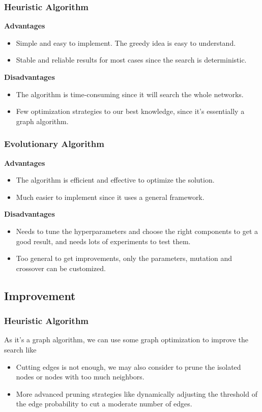 \documentclass{article}
\begin{document}
\subsubsection{Heuristic Algorithm}
\textbf{Advantages}
\begin{itemize}
    \item Simple and easy to implement. The greedy idea is easy to understand.
    \item Stable and reliable results for most cases since the search is deterministic.
\end{itemize}
\textbf{Disadvantages}
\begin{itemize}
    \item The algorithm is time-consuming since it will search the whole networks.
    \item Few optimization strategies to our best knowledge, since it's essentially a graph algorithm.
\end{itemize}

\subsubsection{Evolutionary Algorithm}
\textbf{Advantages}
\begin{itemize}
    \item The algorithm is efficient and effective to optimize the solution.
    \item Much easier to implement since it uses a general framework.
\end{itemize}
\textbf{Disadvantages}
\begin{itemize}
    \item Needs to tune the hyperparameters and choose the right components to get a good result, and needs lots of experiments to test them.
    \item Too general to get improvements, only the parameters, mutation and crossover can be customized.
\end{itemize}

\subsection{Improvement}

\subsubsection{Heuristic Algorithm}
As it's a graph algorithm, we can use some graph optimization to improve the search like
\begin{itemize}
    \item Cutting edges is not enough, we may also consider to prune the isolated nodes or nodes with too much neighbors.
    \item More advanced pruning strategies like dynamically adjusting the threshold of the edge probability to cut a moderate number of edges.
\end{itemize}
\end{document}

